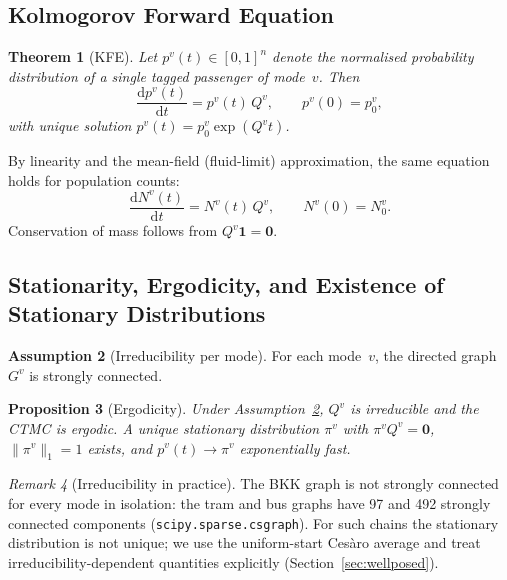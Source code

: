 \documentclass[12pt,a4paper]{article}
\theoremstyle{plain}
\newtheorem{theorem}{Theorem}[section]
\newtheorem{proposition}[theorem]{Proposition}
\theoremstyle{definition}
\newtheorem{assumption}[theorem]{Assumption}
\theoremstyle{remark}
\newtheorem{remark}[theorem]{Remark}
\begin{document}
\subsection{Kolmogorov Forward Equation}

\begin{theorem}[KFE]
Let $p^v(t)\in[0,1]^n$ denote the normalised probability distribution of a
single tagged passenger of mode~$v$.  Then
\begin{equation}
  \frac{\mathrm{d}p^v(t)}{\mathrm{d}t} = p^v(t)\,Q^v,\qquad
  p^v(0)=p^v_0,\label{eq:kfe}
\end{equation}
with unique solution $p^v(t)=p^v_0\exp(Q^v t)$.
\end{theorem}

By linearity and the mean-field (fluid-limit) approximation, the same equation
holds for population counts:
\begin{equation}
  \frac{\mathrm{d}N^v(t)}{\mathrm{d}t} = N^v(t)\,Q^v,\qquad
  N^v(0)=N^v_0.\label{eq:kfe-pop}
\end{equation}
Conservation of mass follows from $Q^v\mathbf{1}=\mathbf{0}$.

\subsection{Stationarity, Ergodicity, and Existence of Stationary Distributions}

\begin{assumption}[Irreducibility per mode]
\label{ass:irreducible}
For each mode~$v$, the directed graph~$G^v$ is strongly connected.
\end{assumption}

\begin{proposition}[Ergodicity]
Under Assumption~\ref{ass:irreducible}, $Q^v$ is irreducible and the CTMC is
ergodic.  A unique stationary distribution $\pi^v$ with $\pi^v Q^v=\mathbf{0}$,
$\|\pi^v\|_1=1$ exists, and $p^v(t)\to\pi^v$ exponentially fast.
\end{proposition}

\begin{remark}[Irreducibility in practice]
The BKK graph is not strongly connected for every mode in isolation: the
tram and bus graphs have 97 and 492 strongly connected components
(\texttt{scipy.sparse.csgraph}).  For such chains the stationary distribution
is not unique; we use the uniform-start Ces\`aro average and treat
irreducibility-dependent quantities explicitly (Section~\ref{sec:wellposed}).
\end{remark}
\end{document}
